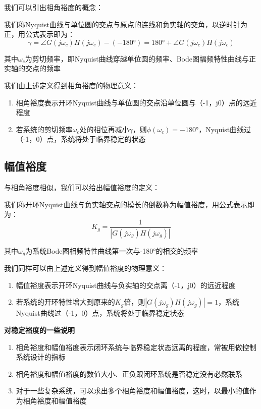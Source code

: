 我们可以引出相角裕度的概念：
\begin{definition}
    我们称Nyquist曲线与单位圆的交点与原点的连线和负实轴的交角，以逆时针为正，用公式表示即为：
    \begin{equation*}
        \gamma = \angle G(j\omega_c) H(j\omega_c) - (-180\text{°}) = 180\text{°} + \angle G(j\omega_c)H(j\omega_c)
    \end{equation*}

    其中$\omega_c$为剪切频率，即Nyquist曲线穿越单位圆的频率、Bode图幅频特性曲线与正实轴的交点的频率
\end{definition}

我们由上述定义得到相角裕度的物理意义：
\begin{enumerate}
    \item 相角裕度表示开环Nyquist曲线与单位圆的交点沿单位圆与（-1，j0）点的远近程度
    \item 若系统的剪切频率$\omega_c$处的相位再减小$\gamma$，则$\phi(\omega_c) = -180$°，Nyquist曲线过（-1，0）点，系统将处于临界稳定的状态 
\end{enumerate}

\subsection{幅值裕度}

与相角裕度相似，我们可以给出幅值裕度的定义：
\begin{definition}
    我们称开环Nyquist曲线与负实轴交点的模长的倒数称为幅值裕度，用公式表示即为：
    \begin{equation*}
        K_g = \frac{1}{\left\lvert G(j\omega_g)H(j\omega_g) \right\rvert}
    \end{equation*}

    其中$\omega_g$为系统Bode图相频特性曲线第一次与-180°的相交的频率
\end{definition}

我们同样可以由上述定义得到幅值裕度的物理意义：
\begin{enumerate}
    \item 幅值裕度表示开环Nyquist曲线与负实轴的交点离（-1，j0）的远近程度
    \item 若系统的开环特性增大到原来的$K_g$倍，则$\left\lvert G(j\omega_g)H(j\omega_g) \right\rvert = 1$，系统Nyquist曲线过（-1，0）点，系统将处于临界稳定状态
\end{enumerate}

\textbf{对稳定裕度的一些说明}
\begin{enumerate}
    \item 相角裕度和幅值裕度表示闭环系统与临界稳定状态远离的程度，常被用做控制系统设计的指标
    \item 相角裕度和幅值裕度的数值大小、正负跟闭环系统是否稳定没有必然联系
    \item 对于一些复杂系统，可以求出多个相角裕度和幅值裕度，这时，以最小的值作为相角裕度和幅值裕度
\end{enumerate}

